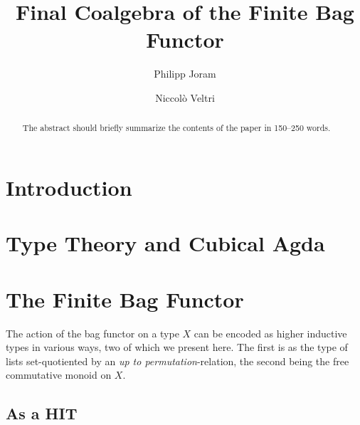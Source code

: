 \documentclass[runningheads]{llncs}
\begin{document}
%
\title{Final Coalgebra of the Finite Bag Functor}
%
%
\author{%
    Philipp Joram \and
    Niccolò Veltri%
}
%
%
%
\maketitle              %
%
\begin{abstract}
The abstract should briefly summarize the contents of the paper in
150--250 words.

\end{abstract}

\section{Introduction}

\section{Type Theory and Cubical Agda}

\section{The Finite Bag Functor}

The action of the bag functor on a type $X$ can be encoded as higher inductive
types in various ways, two of which we present here.
The first is as the type of lists set-quotiented by an \emph{up to permutation}-relation,
the second being the free commutative monoid on $X$.


\subsection{As a HIT}

\newcommand*{\Empty}{\mathsf{\varepsilon}}
\newcommand*{\Singl}{\operatorname{\mathsf{\eta}}}
\newcommand*{\Union}{\mathbin{\oplus}}
\newcommand*{\Var}[1]{\mathit{#1}}
\newcommand*{\Op}[1]{\operatorname{\mathsf{#1}}}
\end{document}
